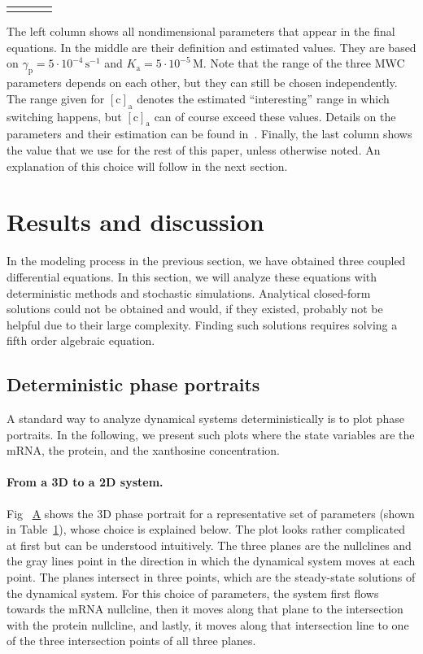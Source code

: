 \documentclass[10pt,letterpaper]{article}
\newlength\savedwidth
\newcommand\thickhline{\noalign{\global\savedwidth\arrayrulewidth\global\arrayrulewidth 2pt}%
\hline
\noalign{\global\arrayrulewidth\savedwidth}}
\newcommand{\unit}[1]{\,\mathrm{#1}}
\newcommand{\n}[1]{\mathrm{#1}}
\newcommand\subref[2]{%
	\def\myref{\getrefnumber{#1}}%
	\hyperref[#1]{\myref\mbox{#2}}%
}
\begin{document}
\begin{table}
\begin{tabular}{rllr}
		\thickhline
	\end{tabular}
	\begin{flushleft} 
		The left column shows all nondimensional parameters that appear in
		the final equations. In the middle are their definition and
		estimated values. They are based on $\gamma_{\n{p}} = 5 \cdot
		10^{-4} \unit{s^{-1}}$ and $K_{\n{a}} = 5 \cdot 10^{-5} \unit{M}$.
		Note that the range of the three MWC parameters depends on each
		other, but they can still be chosen independently. The range given
		for $\n{[c]_{a}}$ denotes the estimated ``interesting'' range in
		which switching happens, but $\n{[c]_{a}}$ can of course exceed
		these values. Details on the parameters and their estimation can be
		found in~. Finally, the last column shows the value
		that we use for the rest of this paper, unless otherwise noted. An
		explanation of this choice will follow in the next section.
	\end{flushleft}
	\label{table1:nondim}
\end{table}


\section*{Results and discussion}
In the modeling process in the previous section, we have obtained three
coupled differential equations. In this section, we will analyze these
equations with deterministic methods and stochastic simulations. Analytical
closed-form solutions could not be obtained and would, if they existed,
probably not be helpful due to their large complexity. Finding such
solutions requires solving a fifth order algebraic equation.

\subsection*{Deterministic phase portraits}
A standard way to analyze dynamical systems deterministically is
to plot phase portraits. In the following, we present such plots where the
state variables are the mRNA, the protein, and the xanthosine concentration.

\paragraph*{From a 3D to a 2D system.} 
Fig~\subref{fig4:bistability}{A} shows the 3D phase portrait for a
representative set of parameters (shown in Table~\ref{table1:nondim}),
whose choice is explained below. The plot looks rather complicated at first
but can be understood intuitively. The three planes are the nullclines and
the gray lines point in the direction in which the dynamical system moves at
each point. The planes intersect in three points, which are the steady-state
solutions of the dynamical system. For this choice of parameters, the system
first flows towards the mRNA nullcline, then it moves along that plane to
the intersection with the protein nullcline, and lastly, it moves along that
intersection line to one of the three intersection points of all three
planes.
\end{document}
